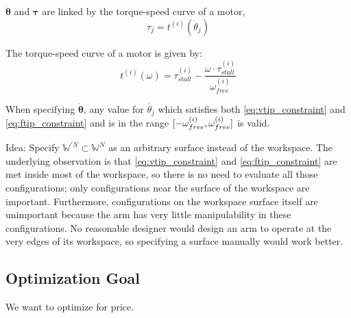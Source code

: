 \documentclass{article}
\begin{document}
$\boldsymbol{\dot{{\theta}}}$ and $\boldsymbol{\tau}$ are linked by the torque-speed curve of a motor,
\begin{equation}
    \tau_j = t^{(i)}(\dot{\theta}_j)
\end{equation}

The torque-speed curve of a motor is given by:
\begin{equation}
    t^{(i)}(\omega) = \tau_{stall}^{(i)} - \frac{\omega \cdot \tau_{stall}^{(i)}}{\omega_{free}^{(i)}}
\end{equation}

When specifying $\boldsymbol{\dot{\theta}}$, any value for $\dot{\theta_j}$
which satisfies both \ref{eq:vtip_constraint} and \ref{eq:ftip_constraint} and
is in the range $\interval{-\omega_{free}^{(i)}}{\omega_{free}^{(i)}}$ is
valid.

Idea: Specify $\mathbb{W}^{\prime N} \subset \mathbb{W}^N$ as an arbitrary surface instead of the
workspace. The underlying observation is that \ref{eq:vtip_constraint} and \ref{eq:ftip_constraint}
are met inside most of the workspace, so there is no need to evaluate all those configurations; only
configurations near the surface of the workspace are important. Furthermore, configurations on the
workspace surface itself are unimportant because the arm has very little manipulability in these
configurations. No reasonable designer would design an arm to operate at the very edges of its
workspace, so specifying a surface manually would work better.

\FloatBarrier
\subsection{Optimization Goal}

We want to optimize for price.
\end{document}
